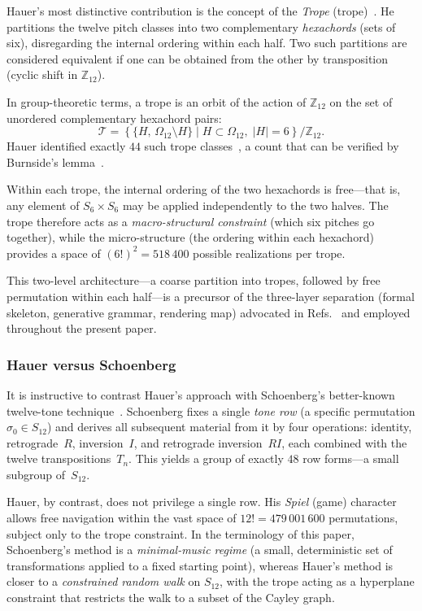 \documentclass[
  twocolumn,
  aps,
  pra,
  showkeys,
  amsmath,amssymb,
  longbibliography
]{revtex4-2}
\begin{document}
Hauer's most distinctive contribution is the concept of the
\emph{Trope} (trope)~\cite{hauer-25,sengstschmid-80}.
He partitions the twelve pitch classes into two complementary
\emph{hexachords} (sets of six), disregarding the internal
ordering within each half.
Two such partitions are considered equivalent if one can be
obtained from the other by transposition
(cyclic shift in $\mathbb{Z}_{12}$).

In group-theoretic terms, a trope is an orbit of the action
of $\mathbb{Z}_{12}$ on the set of unordered complementary
hexachord pairs:
\begin{equation}
\mathcal{T} = \left\{\{H,\,\Omega_{12}\setminus H\}
\;\Big|\; H\subset\Omega_{12},\;|H|=6\right\}
\Big/ \mathbb{Z}_{12}.
\label{eq:tropes}
\end{equation}
Hauer identified exactly $44$ such trope
classes~\cite{hauer-26,sengstschmid-80,haluska-04}, a count
that can be verified by Burnside's
lemma~\cite{burnside-1897}.

Within each trope, the internal ordering of the two hexachords
is free---that is, any element of $S_6\times S_6$ may be
applied independently to the two halves.
The trope therefore acts as a \emph{macro-structural
constraint} (which six pitches go together), while the
micro-structure (the ordering within each hexachord) provides
a space of $(6!)^2 = 518\,400$ possible realizations per
trope.

This two-level architecture---a coarse partition into tropes,
followed by free permutation within each half---is a
precursor of the three-layer separation (formal skeleton,
generative grammar, rendering map) advocated in
Refs.~\cite{jendreiko-svozil-2026,Jendreiko2025} and employed
throughout the present paper.

\subsubsection{Hauer versus Schoenberg}

It is instructive to contrast Hauer's approach with
Schoenberg's better-known twelve-tone
technique~\cite{schoenberg-75}.
Schoenberg fixes a single \emph{tone row} (a specific
permutation $\sigma_0\in S_{12}$) and derives all subsequent
material from it by four operations: identity,
retrograde~$R$, inversion~$I$, and retrograde
inversion~$RI$, each combined with the twelve
transpositions~$T_n$.
This yields a group of exactly $48$ row forms---a small
subgroup of~$S_{12}$.

Hauer, by contrast, does not privilege a single row.
His \emph{Spiel} (game) character allows free navigation
within the vast space of $12!=479\,001\,600$ permutations,
subject only to the trope constraint.
In the terminology of this paper, Schoenberg's method is a
\emph{minimal-music regime} (a small, deterministic set of
transformations applied to a fixed starting point), whereas
Hauer's method is closer to a \emph{constrained random walk}
on $S_{12}$, with the trope acting as a hyperplane constraint
that restricts the walk to a subset of the Cayley graph.
\end{document}
